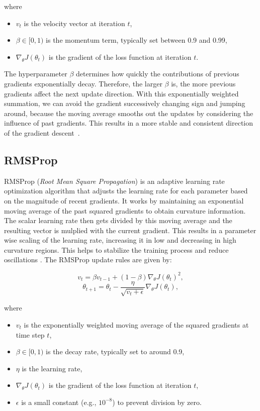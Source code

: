 where
\begin{itemize}
    \item $v_t$ is the velocity vector at iteration $t$,
    \item $\beta \in [0, 1) $ is the momentum term, typically set between 0.9 and 0.99,
    \item $\nabla_{\theta} J(\theta_t)$ is the gradient of the loss function at iteration $t$.
\end{itemize}
The hyperparameter $\beta$ determines how quickly the contributions of previous gradients
exponentially decay. Therefore, the larger $\beta$ is, the more previous gradients affect
the next update direction. With this exponentially weighted summation, we can avoid the gradient successively changing sign
and jumping around, because the moving average smooths out the updates by considering the influence of past gradients.
This results in a more stable and consistent direction of the gradient descent~\cite{Goodfellow-et-al-2016}.

\subsection{RMSProp \cite{Goodfellow-et-al-2016}}
\label{sec:rmsprop}

RMSProp (\emph{Root Mean Square Propagation}) \cite{hintonrms} is an adaptive learning rate optimization algorithm that adjusts the learning rate
for each parameter based on the magnitude of recent gradients.
It works by maintaining an exponential moving average of the past squared gradients to obtain curvature information. The scalar learning rate
then gets divided by this moving average and the resulting vector is mulplied with the current gradient.
This results in a parameter wise scaling of the learning rate, increasing it in low and
decreasing in high curvature regions.
This helps to stabilize the training process and reduce oscillations \cite{Goodfellow-et-al-2016}. The RMSProp update rules are given by:

\[v_t = \beta v_{t-1} + (1 - \beta) \nabla_{\theta} J(\theta_t)^2,\]
\[\theta_{t+1} = \theta_t - \frac{\eta}{\sqrt{v_t + \epsilon}} \nabla_{\theta} J(\theta_t),\]

where
\begin{itemize}
    \item $v_t$ is the exponentially weighted moving average of the squared gradients at time step $t$,
    \item $\beta \in [0, 1) $ is the decay rate, typically set to around 0.9,
    \item $\eta$ is the learning rate,
    \item $\nabla_{\theta} J(\theta_t)$ is the gradient of the loss function at iteration $t$,
    \item $\epsilon$ is a small constant (e.g., $10^{-8}$) to prevent division by zero.
\end{itemize}

